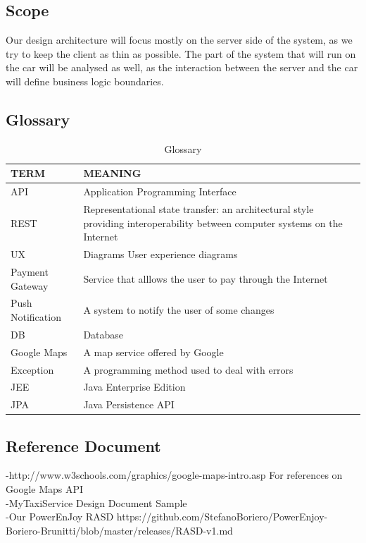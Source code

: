 \documentclass{article}
\begin{document}
\subsection{Scope}
Our design architecture will focus mostly on the server side of the system, as we try to keep the client as thin as possible. The part of the system that will run on the car will be analysed as well, as the interaction between the server and the car will define business logic boundaries.
\subsection{Glossary}
\begin{table}[H]
\centering
\caption{Glossary}
\label{my-label}
\begin{tabular}{|l|p{8cm}|}
\hline

TERM & MEANING\\
\hline


API & Application Programming Interface\\\hline
REST &  Representational state transfer: an architectural style providing interoperability between computer systems on the Internet  \\ \hline
UX & Diagrams User experience diagrams  \\ \hline
Payment Gateway & Service that alllows the user to pay through the Internet \\ \hline
Push Notification & A system to notify the user of some changes \\ \hline
DB & Database\\ \hline
Google Maps & A map service offered by Google \\ \hline
Exception & A programming method used to deal with errors \\ \hline
JEE & Java Enterprise Edition \\ \hline
JPA & Java Persistence API \\ \hline
\end{tabular}
\end{table}
\subsection{Reference Document}
-http://www.w3schools.com/graphics/google-maps-intro.asp For references on Google Maps API  \\
-MyTaxiService Design Document Sample \\
-Our PowerEnJoy RASD https://github.com/StefanoBoriero/PowerEnjoy-Boriero-Brunitti/blob/master/releases/RASD-v1.md
\end{document}
